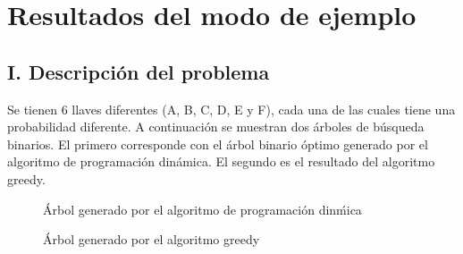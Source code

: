 \documentclass{article}
\begin{document}
\section*{Resultados del modo de ejemplo}
\subsection*{I. Descripción del problema}
Se tienen 6 llaves diferentes (A, B, C, D, E y F), cada una de las cuales tiene una probabilidad diferente. A continuaci\'on se muestran dos \'arboles de b\'usqueda binarios. El primero corresponde con el \'arbol binario \'optimo generado por el algoritmo de programaci\'on din\'amica. El segundo es el resultado del algoritmo greedy.
\begin{figure}[ht]
\centering
{}
\caption{\'Arbol generado por el algoritmo de programación din\'mica}
\label{pd}
\end{figure}
\begin{figure}[ht]
\centering
{}
\caption{\'Arbol generado por el algoritmo greedy}
\label{greedy}
\end{figure}
\end{document}
